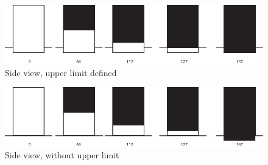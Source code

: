 \begin{figure}
    \includegraphics[width=\linewidth]{./resources/Asset 7.pdf}
    \caption{Side view, upper limit defined}\label{fig:Asset7}
\end{figure}

\begin{figure}
    \includegraphics[width=\linewidth]{./resources/Asset 9.pdf}
    \caption{Side view, without upper limit}\label{fig:Asset9}
\end{figure}